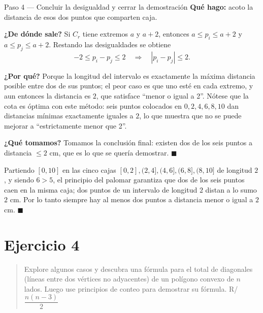 \documentclass[11pt]{article}
\begin{document}
\begin{paso}{Paso 4 --- Concluir la desigualdad y cerrar la demostración}
\textbf{Qué hago:} acoto la distancia de esos dos puntos que comparten caja.

\textbf{¿De dónde sale?} Si $C_r$ tiene extremos $a$ y $a+2$, entonces $a\le p_i\le a+2$ y
$a\le p_j\le a+2$. Restando las desigualdades se obtiene
\[
-2\le p_i-p_j\le 2 \quad\Longrightarrow\quad |p_i-p_j|\le 2.
\]

\textbf{¿Por qué?} Porque la longitud del intervalo es exactamente la máxima distancia posible entre
dos de sus puntos; el peor caso es que uno esté en cada extremo, y aun entonces la distancia es $2$,
que satisface ``menor o igual a 2''. Nótese que la cota es óptima con este método: seis puntos
colocados en $0,2,4,6,8,10$ dan distancias mínimas exactamente iguales a $2$, lo que muestra que no se
puede mejorar a ``estrictamente menor que 2''.

\textbf{¿Qué tomamos?} Tomamos la conclusión final: existen dos de los seis puntos a distancia
$\le 2$ cm, que es lo que se quería demostrar. $\blacksquare$
\end{paso}

\begin{resp}
Partiendo $[0,10]$ en las cinco cajas $[0,2],(2,4],(4,6],(6,8],(8,10]$ de longitud $2$, y siendo
$6>5$, el principio del palomar garantiza que dos de los seis puntos caen en la misma caja; dos puntos
de un intervalo de longitud $2$ distan a lo sumo $2$ cm. Por lo tanto siempre hay al menos dos puntos
a distancia menor o igual a $2$ cm. $\blacksquare$
\end{resp}

\section*{Ejercicio 4}

\begin{quote}
Explore algunos casos y descubra una fórmula para el total de diagonales (líneas entre dos vértices no
adyacentes) de un polígono convexo de $n$ lados. Luego use principios de conteo para demostrar su
fórmula. \hfill R/ $\dfrac{n(n-3)}{2}$
\end{quote}
\end{document}
